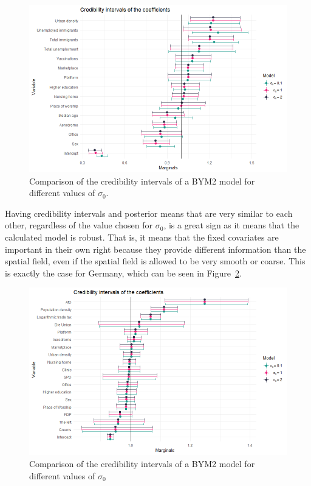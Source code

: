 \begin{figure}[H]
  \centering
  \includegraphics[width = \textwidth]{intervals_prior_norway.png}
  \caption{Comparison of the credibility intervals of a BYM2 model for different values of $\sigma_0$.}
  \label{comparison_norway_5}
\end{figure}
Having credibility intervals and posterior means that are very similar to each other, regardless of the value chosen for $\sigma_0$, is a great sign as it means that the calculated model is robust. That is, it means that the fixed covariates are important in their own right because they provide different information than the spatial field, even if the spatial field is allowed to be very smooth or coarse. This is exactly the case for Germany, which can be seen in Figure~\ref{comparison_germany_5}.
\begin{figure}[H]
    \centering
    \includegraphics[width = \textwidth]{intervals_prior_germany.png}
    \caption{Comparison of the credibility intervals of a BYM2 model for different values of $\sigma_0$}
    \label{comparison_germany_5}
\end{figure}
